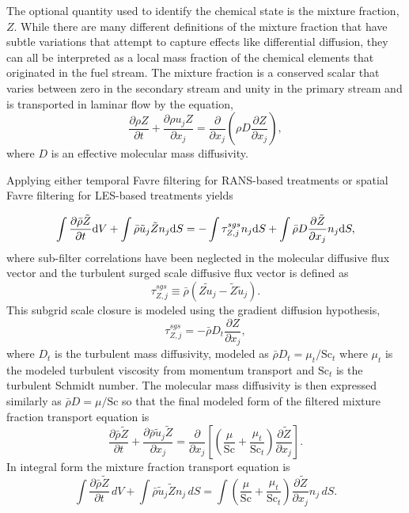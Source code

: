 The optional quantity used to identify the chemical state is the mixture 
fraction, $Z$.  While there are many 
different definitions of the mixture fraction that have subtle variations
that attempt to capture effects like differential diffusion, they can all 
be interpreted as a local mass fraction of the chemical elements that
originated in the fuel stream.  The mixture fraction is a
conserved scalar that varies between zero in the secondary stream and unity in the
primary stream and is transported in laminar flow by the equation,
%
\begin{equation}
\frac{\partial \rho Z}{\partial t}
  + \frac{ \partial \rho u_j Z }{ \partial x_j}
  = \frac{\partial}{\partial x_j} \left( \rho D \frac{\partial Z}{\partial x_j}
    \right),  \label{eqn:lam_Z}
\end{equation}
%
where $D$ is an effective molecular mass diffusivity.

Applying either temporal Favre filtering for RANS-based treatments or 
spatial Favre filtering for LES-based treatments yields

\begin{equation}
\int \frac{\partial \bar{\rho} \tilde{Z}}{\partial t} {\rm d}V
  + \int \bar{\rho} \tilde{u}_j \tilde{Z} n_j {\rm d}S
  = -\int \tau^{sgs}_{Z,j} n_j {\rm d}S + \int \bar{\rho} D \frac{\partial \tilde{Z}}{\partial x_j} n_j {\rm d}S,  \label{eqn:turb_Z}
\end{equation}
%
where sub-filter correlations have been neglected in the molecular diffusive
flux vector and the turbulent surged scale diffusive flux vector is defined as
%
\begin{equation}
\tau^{sgs}_{Z,j} \equiv \bar{\rho} \left( \widetilde{Z u_j} -
  \tilde{Z} \tilde{u}_j \right).
\end{equation}
%
This subgrid scale closure is modeled using the gradient diffusion hypothesis,
%
\begin{equation}
\tau^{sgs}_{Z,j} = - \bar{\rho} D_t \frac{\partial Z}{\partial x_j},
\end{equation}
%
where $D_t$ is the turbulent mass diffusivity, modeled as $\bar{\rho} D_t =
\mu_t / \mathrm{Sc}_t$ where $\mu_t$ is the modeled turbulent viscosity
from momentum transport and $\mathrm{Sc}_t$ is the turbulent Schmidt number.
The molecular mass
diffusivity is then expressed similarly as $\bar{\rho} D = \mu / \mathrm{Sc}$
so that the final modeled form of the filtered mixture fraction transport
equation is
%
\begin{equation}
\frac{\partial \bar{\rho} \tilde{Z}}{\partial t}
  + \frac{ \partial \bar{\rho} \tilde{u}_j \tilde{Z} }{ \partial x_j}
  = \frac{\partial}{\partial x_j} 
    \left[ \left( \frac{\mu}{\mathrm{Sc}} + \frac{\mu_t}{\mathrm{Sc}_t} \right)
    \frac{\partial \tilde{Z}}{\partial x_j} \right].
\end{equation}
%
In integral form the mixture fraction transport equation is
%
\begin{equation}
\int \frac{\partial \bar{\rho} \tilde{Z}}{\partial t}\, dV
  + \int \bar{\rho} \tilde{u}_j \tilde{Z} n_j\, dS
  = \int \left( \frac{\mu}{\mathrm{Sc}} + \frac{\mu_t}{\mathrm{Sc}_t} \right)
    \frac{\partial \tilde{Z}}{\partial x_j} n_j\, dS.
\end{equation}

